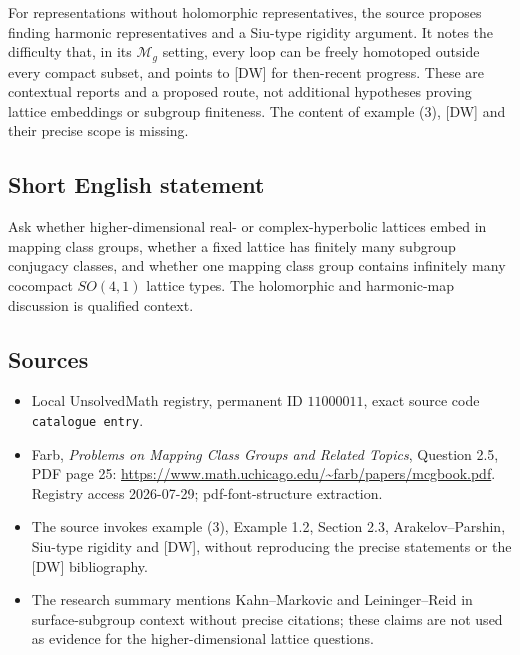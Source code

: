 \documentclass[11pt]{article}
\begin{document}
For representations without holomorphic representatives, the source proposes finding harmonic representatives and a Siu-type rigidity argument. It notes the difficulty that, in its \(\mathcal M_g\) setting, every loop can be freely homotoped outside every compact subset, and points to [DW] for then-recent progress. These are contextual reports and a proposed route, not additional hypotheses proving lattice embeddings or subgroup finiteness. The content of example (3), [DW] and their precise scope is missing.
\subsection{Short English statement}
Ask whether higher-dimensional real- or complex-hyperbolic lattices embed in mapping class groups, whether a fixed lattice has finitely many subgroup conjugacy classes, and whether one mapping class group contains infinitely many cocompact \(SO(4,1)\) lattice types. The holomorphic and harmonic-map discussion is qualified context.
\subsection{Sources}
\begin{itemize}
\item Local UnsolvedMath registry, permanent ID \(11000011\), exact source code \texttt{catalogue entry}.
\item Farb, \emph{Problems on Mapping Class Groups and Related Topics}, Question 2.5, PDF page 25: \url{https://www.math.uchicago.edu/~farb/papers/mcgbook.pdf}. Registry access 2026-07-29; pdf-font-structure extraction.
\item The source invokes example (3), Example 1.2, Section 2.3, Arakelov--Parshin, Siu-type rigidity and [DW], without reproducing the precise statements or the [DW] bibliography.
\item The research summary mentions Kahn--Markovic and Leininger--Reid in surface-subgroup context without precise citations; these claims are not used as evidence for the higher-dimensional lattice questions.
\end{itemize}
\end{document}
